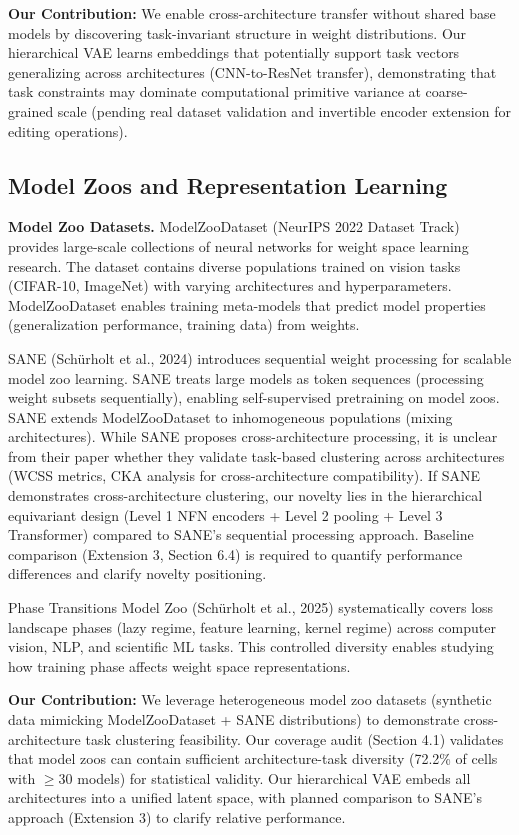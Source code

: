 \textbf{Our Contribution:} We enable cross-architecture transfer without shared base models by discovering task-invariant structure in weight distributions. Our hierarchical VAE learns embeddings that potentially support task vectors generalizing across architectures (CNN-to-ResNet transfer), demonstrating that task constraints may dominate computational primitive variance at coarse-grained scale (pending real dataset validation and invertible encoder extension for editing operations).

\subsection{Model Zoos and Representation Learning}

\textbf{Model Zoo Datasets.} ModelZooDataset (NeurIPS 2022 Dataset Track) provides large-scale collections of neural networks for weight space learning research. The dataset contains diverse populations trained on vision tasks (CIFAR-10, ImageNet) with varying architectures and hyperparameters. ModelZooDataset enables training meta-models that predict model properties (generalization performance, training data) from weights.

SANE (Schürholt et al., 2024) introduces sequential weight processing for scalable model zoo learning. SANE treats large models as token sequences (processing weight subsets sequentially), enabling self-supervised pretraining on model zoos. SANE extends ModelZooDataset to inhomogeneous populations (mixing architectures). While SANE proposes cross-architecture processing, it is unclear from their paper whether they validate task-based clustering across architectures (WCSS metrics, CKA analysis for cross-architecture compatibility). If SANE demonstrates cross-architecture clustering, our novelty lies in the hierarchical equivariant design (Level 1 NFN encoders + Level 2 pooling + Level 3 Transformer) compared to SANE's sequential processing approach. Baseline comparison (Extension 3, Section 6.4) is required to quantify performance differences and clarify novelty positioning.

Phase Transitions Model Zoo (Schürholt et al., 2025) systematically covers loss landscape phases (lazy regime, feature learning, kernel regime) across computer vision, NLP, and scientific ML tasks. This controlled diversity enables studying how training phase affects weight space representations.

\textbf{Our Contribution:} We leverage heterogeneous model zoo datasets (synthetic data mimicking ModelZooDataset + SANE distributions) to demonstrate cross-architecture task clustering feasibility. Our coverage audit (Section 4.1) validates that model zoos can contain sufficient architecture-task diversity (72.2\% of cells with $\geq$30 models) for statistical validity. Our hierarchical VAE embeds all architectures into a unified latent space, with planned comparison to SANE's approach (Extension 3) to clarify relative performance.

